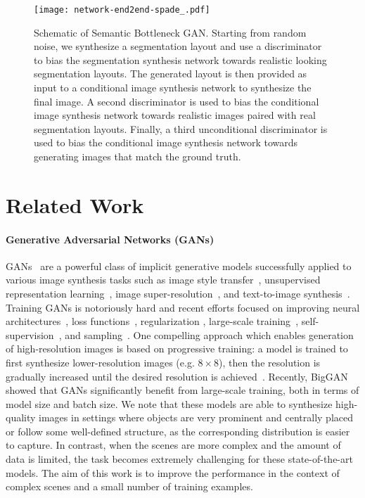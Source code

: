 \documentclass[10pt,twocolumn,letterpaper]{article}
\begin{document}
\begin{figure*}[t!]
\centering
\texttt{[image: network-end2end-spade\_.pdf]}
\caption{Schematic of Semantic Bottleneck GAN. Starting from random noise, we synthesize a segmentation layout and use a discriminator to bias the segmentation synthesis network towards realistic looking segmentation layouts. The generated layout is then provided as input to a conditional image synthesis network to synthesize the final image. A second discriminator is used to bias the conditional image synthesis network towards realistic images paired with real segmentation layouts. Finally, a third unconditional discriminator is used to bias the conditional image synthesis network towards generating images that match the ground truth.}
\label{fig:end2end}
\end{figure*}

\section{Related Work}
\paragraph{Generative Adversarial Networks (GANs)}
GANs~\cite{GAN} are a powerful class of implicit generative models successfully applied to various image synthesis tasks such as image style transfer~\cite{pix2pix, cyclegan}, unsupervised representation learning~\cite{infogan, contextencoder, radford2015unsupervised}, image super-resolution~\cite{ledig2016photo, dong2016image}, and text-to-image synthesis~\cite{stackgan,attngan,qiao2019mirrorgan}. 
Training GANs is notoriously hard and recent efforts focused on improving neural architectures~\cite{PGGAN,sagan,chen2018on}, loss functions~\cite{wgan}, regularization \cite{improvedWGAN, spectralnorm}, large-scale training~\cite{biggan}, self-supervision~\cite{chen2019self}, and sampling~\cite{biggan, DRS}. One compelling approach which enables generation of high-resolution images is based on progressive training: a model is trained to first synthesize lower-resolution images (e.g. $8\times 8$), then the resolution is gradually increased until the desired resolution is achieved~\cite{PGGAN}. Recently, BigGAN~\cite{biggan} showed that GANs significantly benefit from large-scale training, both in terms of model size and batch size. We note that these models are able to synthesize high-quality images in settings where objects are very prominent and centrally placed or follow some well-defined structure, as the corresponding distribution is easier to capture. In contrast, when the scenes are more complex and the amount of data is limited, the task becomes extremely challenging for these state-of-the-art models. The aim of this work is to improve the performance in the context of complex scenes and a small number of training examples.
\end{document}
